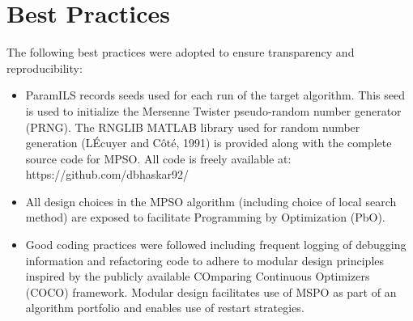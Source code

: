 \section{Best Practices}

The following best practices were adopted to ensure transparency and reproducibility:

\begin{itemize}

\item ParamILS records seeds used for each run of the target algorithm. This seed is used to initialize the Mersenne Twister pseudo-random number generator (PRNG). The RNGLIB MATLAB library used for random number generation (L\'Ecuyer and C\^{o}t\'{e}, 1991) is provided along with the complete source code for MPSO. All code is freely available at: https://github.com/dbhaskar92/

\item All design choices in the MPSO algorithm (including choice of local search method) are exposed to facilitate Programming by Optimization (PbO).

\item Good coding practices were followed including frequent logging of debugging information and refactoring code to adhere to modular design principles inspired by the publicly available COmparing Continuous Optimizers (COCO) framework. Modular design facilitates use of MSPO as part of an algorithm portfolio and enables use of restart strategies.  

\end{itemize}

